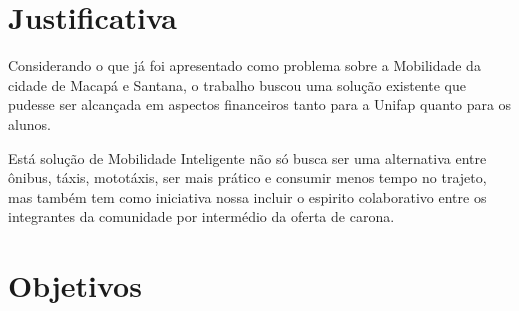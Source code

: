 \section{Justificativa}



Considerando o que já foi apresentado como problema sobre a Mobilidade da cidade de Macapá e Santana, o trabalho buscou uma solução existente que pudesse ser alcançada em aspectos financeiros tanto para a Unifap quanto para os alunos. 

Está solução de Mobilidade Inteligente não só busca ser uma alternativa entre ônibus, táxis, mototáxis, ser mais prático e consumir menos tempo no trajeto, mas também tem como iniciativa nossa incluir o espirito colaborativo entre os integrantes da comunidade por intermédio da oferta de carona.



\begin{comment}
que os problemas de mobilidade existentes
atualmente em Macapá atingem diretamente a comunidade acadêmica da Universidade Federal do Amapá, este trabalho buscará entender o perfil e as principais dificuldades da comunidade acadêmica, e, a partir de um estudo de soluções existentes no contexto de CI para propor uma solução que seja viável e admissível para a comunidade acadêmica da Unifap

%
\end{comment}

\section {Objetivos}

